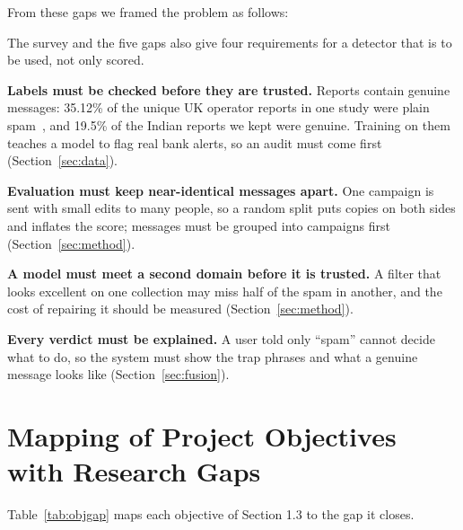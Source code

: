 From these gaps we framed the problem as follows:

\begin{center}
\end{center}

The survey and the five gaps also give four requirements for a detector that is to be used, not only scored.

\textbf{Labels must be checked before they are trusted.} Reports contain genuine messages: 35.12\% of the unique UK operator reports in one study were plain spam~\cite{agarwal2026overview}, and 19.5\% of the Indian reports we kept were genuine. Training on them teaches a model to flag real bank alerts, so an audit must come first (Section~\ref{sec:data}).

\textbf{Evaluation must keep near-identical messages apart.} One campaign is sent with small edits to many people, so a random split puts copies on both sides and inflates the score; messages must be grouped into campaigns first (Section~\ref{sec:method}).

\textbf{A model must meet a second domain before it is trusted.} A filter that looks excellent on one collection may miss half of the spam in another, and the cost of repairing it should be measured (Section~\ref{sec:method}).

\textbf{Every verdict must be explained.} A user told only ``spam'' cannot decide what to do, so the system must show the trap phrases and what a genuine message looks like (Section~\ref{sec:fusion}).

\section{Mapping of Project Objectives with Research Gaps}
Table~\ref{tab:objgap} maps each objective of Section 1.3 to the gap it closes.


